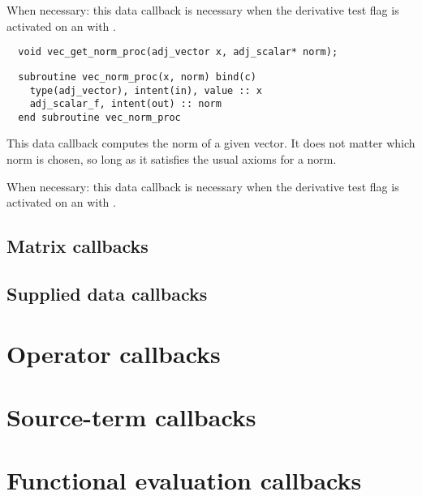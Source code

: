 When necessary: this data callback is necessary when the derivative test flag
is activated on an  with .
\begin{framed}
\vspace{-0.7cm}
\begin{verbatim}
  void vec_get_norm_proc(adj_vector x, adj_scalar* norm);
\end{verbatim}
\vspace{-1.0cm}
\begin{verbatim}
  subroutine vec_norm_proc(x, norm) bind(c)
    type(adj_vector), intent(in), value :: x
    adj_scalar_f, intent(out) :: norm
  end subroutine vec_norm_proc
\end{verbatim}
\vspace{-0.5cm}
\end{framed}
This data callback computes the norm of a given vector. It does not matter
which norm is chosen, so long as it satisfies the usual axioms for a norm.

When necessary: this data callback is necessary when the derivative test flag
is activated on an  with .
\subsection{Matrix callbacks}
\subsection{Supplied data callbacks}

\section{Operator callbacks}

\section{Source-term callbacks}

\section{Functional evaluation callbacks}
